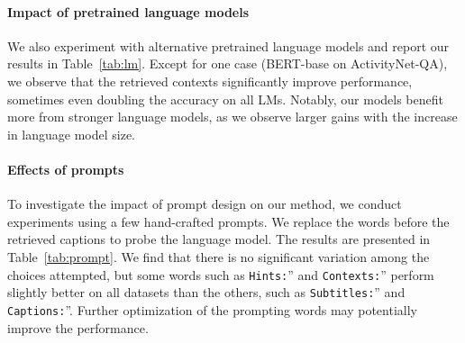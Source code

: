 \vspace{-3.5mm}

\paragraph{Impact of pretrained language models} We also experiment with alternative pretrained language models and report our results in Table~\ref{tab:lm}. Except for one case (BERT-base on ActivityNet-QA), we observe that the retrieved contexts significantly improve performance, sometimes even doubling the accuracy on all LMs. Notably, our models benefit more from stronger language models, as we observe larger gains with the increase in language model size. 
\vspace{-3.5mm}



\paragraph{Effects of prompts} To investigate the impact of prompt design on our method, we conduct experiments using a few hand-crafted prompts. We replace the words before the retrieved captions to probe the language model. The results are presented in Table~\ref{tab:prompt}. We find that there is no significant variation among the choices attempted, but some words such as {\tt Hints:}'' and {\tt Contexts:}'' perform slightly better on all datasets than the others, such as {\tt Subtitles:}'' and {\tt Captions:}''. Further optimization of the prompting words may potentially improve the performance.
\begin{table}[t]
    \centering
     \vspace{-2mm}
    \caption{{\bf Effects of using different prompts.} We use WebVid-10M as the retrieval set and 20 retrieved sentences in all experiments.}
    \vspace{-6mm}
    \label{tab:prompt}
\end{table} \vspace{-3.5mm}
